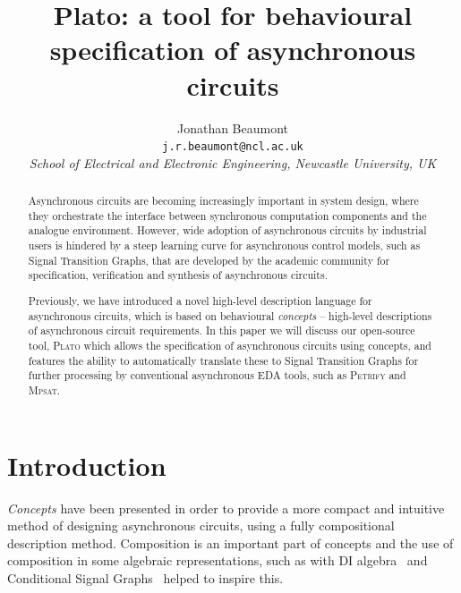 \documentclass[british,conference,compsoc]{IEEEtran}
\newcommand{\noun}[1]{\textsc{#1}}
\begin{document}
\twocolumn

\title{Plato: a tool for behavioural 
\\ specification of asynchronous circuits}
\author{Jonathan Beaumont\\
\texttt{j.r.beaumont@ncl.ac.uk}\\
\emph{School of Electrical and Electronic Engineering, Newcastle University,
UK}}

\maketitle

\begin{abstract}
Asynchronous circuits are becoming increasingly important in
system design, where they orchestrate
the interface between synchronous computation components
and the analogue environment.
However, wide adoption of asynchronous circuits by industrial users is
hindered by a steep learning curve for asynchronous control models,
such as Signal Transition Graphs, that are developed by the academic
community for specification, verification and synthesis of
asynchronous circuits.

Previously, we have introduced a novel high-level description language
for asynchronous circuits, which is based on behavioural
\textit{concepts} -- high-level descriptions of asynchronous circuit
requirements.
In this paper we will discuss our open-source tool, \noun{Plato} 
which allows the specification of asynchronous circuits using concepts, and 
features the ability to automatically translate these to Signal Transition 
Graphs for further processing by conventional asynchronous EDA 
tools, such as \noun{Petrify} and \noun{Mpsat}.
\end{abstract}

\sloppy
\thispagestyle{empty}

\vspace{-3mm}

\section{Introduction}

\vspace{-3mm}

\emph{Concepts} have been presented in order to provide a more compact
and intuitive method of designing asynchronous circuits, using a fully
compositional description method. Composition is an 
important part of concepts and the use of composition in some algebraic 
representations, such as with DI algebra~\cite{270632} and Conditional Signal 
Graphs~\cite{6243877} helped to inspire this. 
\end{document}
